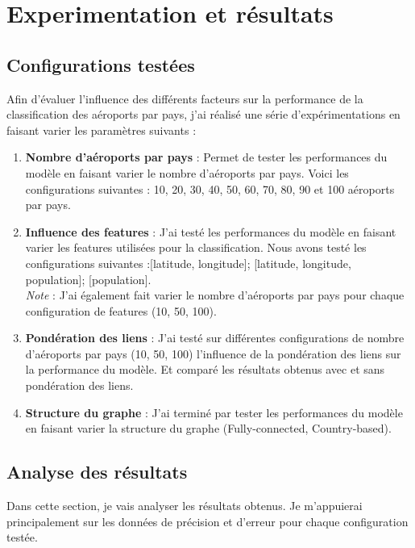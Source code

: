 \section{Experimentation et résultats}

\subsection{Configurations testées}

Afin d'évaluer l'influence des différents facteurs sur la performance de la
classification des aéroports par pays, j'ai réalisé une série
d'expérimentations en faisant varier les paramètres suivants :

\begin{enumerate}
    \item {
          \textbf{Nombre d'aéroports par pays} : Permet de tester les performances du modèle en faisant varier le nombre d'aéroports par pays. Voici les configurations suivantes : 10, 20, 30, 40, 50, 60, 70, 80, 90 et 100 aéroports par pays.
          }
    \item {
          \textbf{Influence des features} : J'ai testé les performances du modèle en faisant varier les features utilisées pour la classification. Nous avons testé les configurations suivantes :[latitude, longitude]; [latitude, longitude, population]; [population].\\
          \textit{Note} : J'ai également fait varier le nombre d'aéroports par pays pour chaque configuration de features (10, 50, 100).
          }
    \item {
          \textbf{Pondération des liens} : J'ai testé sur différentes configurations de nombre d'aéroports par pays (10, 50, 100) l'influence de la pondération des liens sur la performance du modèle. Et comparé les résultats obtenus avec et sans pondération des liens.
          }
    \item {
          \textbf{Structure du graphe} : J'ai terminé par tester les performances du modèle en faisant varier la structure du graphe (Fully-connected, Country-based).
          }
\end{enumerate}

\subsection{Analyse des résultats}

Dans cette section, je vais analyser les résultats obtenus. Je m'appuierai
principalement sur les données de précision et d'erreur pour chaque
configuration testée.\\

